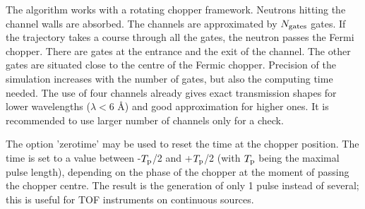 The algorithm works with a rotating chopper framework. Neutrons hitting the channel
walls are absorbed. The channels are approximated by $N_{\rm gates}$ gates. If the trajectory
takes a course through all the gates, the neutron passes the Fermi chopper. There are gates at
the entrance and the exit of the channel. The other gates are situated close to the centre of
the Fermic chopper.
Precision of the simulation increases with the number of gates, but also the computing time needed.
The use of four channels already gives exact transmission shapes for lower wavelengths
($\lambda < 6$ \AA) and good approximation for higher ones. It is recommended to use larger number of
channels only for a check.

The option 'zerotime' may be used to reset the time at the chopper position. The time is
set to a value between -$T_{\rm p}$/2 and +$T_{\rm p}$/2 (with $T_{\rm p}$ being the maximal pulse length),
depending on the phase of the chopper at the moment of passing the chopper centre. The
result is the generation of only 1 pulse instead of several; this is useful for TOF instruments
on continuous sources.
